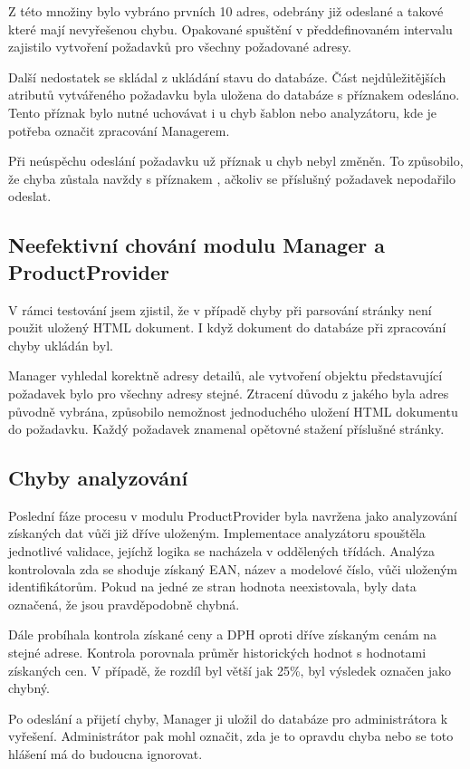 \documentclass[thesis=B,czech]{FITthesis}[2012/06/26]
\begin{document}
Z této množiny bylo vybráno prvních 10 adres, odebrány již odeslané a takové které mají nevyřešenou chybu. Opakované spuštění v předdefinovaném 
intervalu zajistilo vytvoření požadavků pro všechny požadované adresy.
\par
Další nedostatek se skládal z ukládání stavu do databáze. Část nejdůležitějších atributů vytvářeného požadavku byla uložena do databáze 
s příznakem odesláno. Tento příznak bylo nutné uchovávat i u chyb šablon nebo analyzátoru, kde je potřeba označit zpracování Managerem. 
\par
Při neúspěchu odeslání požadavku už příznak u chyb nebyl změněn. To způsobilo, že chyba zůstala navždy s příznakem , ačkoliv
se příslušný požadavek nepodařilo odeslat.

\subsection{Neefektivní chování modulu Manager a ProductProvider}\label{ch:manager-pd}
V rámci testování jsem zjistil, že v případě chyby při parsování stránky není použit uložený HTML dokument. I když dokument do databáze
při zpracování chyby ukládán byl.  
\par
Manager vyhledal korektně adresy detailů, ale vytvoření objektu představující požadavek bylo pro všechny adresy stejné. 
Ztracení důvodu z jakého byla adres původně vybrána, způsobilo nemožnost jednoduchého uložení HTML dokumentu do požadavku. Každý požadavek znamenal opětovné stažení příslušné stránky.

\subsection{Chyby analyzování}
Poslední fáze procesu v modulu ProductProvider byla navržena jako analyzování získaných dat vůči již dříve uloženým. Implementace analyzátoru 
spouštěla jednotlivé validace, jejíchž logika se nacházela v oddělených třídách. 
Analýza kontrolovala zda se shoduje získaný EAN, název a modelové číslo, vůči uloženým identifikátorům. Pokud na jedné ze stran hodnota neexistovala, byly data označená, že jsou pravděpodobně chybná. 
\par
Dále probíhala kontrola získané ceny  a  DPH oproti dříve získaným cenám na stejné adrese. Kontrola porovnala průměr historických hodnot s hodnotami získaných cen. V případě, že rozdíl byl větší jak 25\%, byl výsledek označen jako chybný.
\par
Po odeslání a přijetí chyby, Manager ji uložil do databáze pro administrátora k vyřešení. Administrátor pak mohl 
označit, zda je to opravdu chyba nebo se toto hlášení má do budoucna ignorovat.
\par
\end{document}
